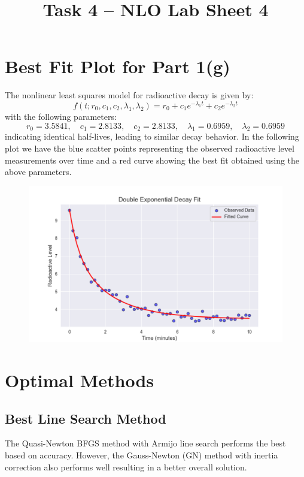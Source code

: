 \documentclass{article}
\begin{document}
\title{Task 4 -- NLO Lab Sheet 4}
\maketitle


\section{Best Fit Plot for Part 1(g)}

The nonlinear least squares model for radioactive decay is given by:  
\[
f(t; r_0, c_1, c_2, \lambda_1, \lambda_2) = r_0 + c_1 e^{-\lambda_1 t} + c_2 e^{-\lambda_2 t}
\]
with the following parameters:  
\[
r_0 = 3.5841, \quad c_1 = 2.8133, \quad c_2 = 2.8133, \quad \lambda_1 = 0.6959, \quad \lambda_2 = 0.6959
\]
indicating identical half-lives, leading to similar decay behavior. In the following plot we have the blue scatter points representing the observed radioactive level measurements over time and a red curve showing the best fit obtained using the above parameters.


\begin{figure}[H]
    \centering
    \includegraphics[width=1\textwidth]{NLO7.png}
\end{figure}


\section{Optimal Methods}

\subsection{Best Line Search Method}
The Quasi-Newton BFGS method with Armijo line search performs the best based on accuracy. However, the Gauss-Newton (GN) method with inertia correction also performs well resulting in a better overall solution. 
\end{document}
